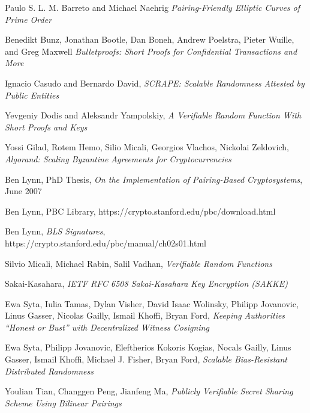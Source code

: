 \documentclass{yellowpaper}
\begin{document}
\begin{thebibliography}{99}

Paulo S. L. M. Barreto and Michael Naehrig
{\em{Pairing-Friendly Elliptic Curves of Prime Order}}

 Benedikt Bunz, Jonathan Bootle, Dan Boneh, Andrew Poelstra, Pieter Wuille, and Greg Maxwell
{\em{Bulletproofs: Short Proofs for Confidential Transactions and More}}

Ignacio Casudo and Bernardo David, 
{\em{ SCRAPE: Scalable Randomness Attested by Public Entities}} 

Yevgeniy Dodis and Aleksandr Yampolskiy, 
{\em{A Verifiable Random Function With Short Proofs and Keys}}

Yossi Gilad, Rotem Hemo, Silio Micali, Georgios Vlachos, Nickolai Zeldovich,
{\em{Algorand: Scaling Byzantine Agreements for Cryptocurrencies}}

 Ben Lynn, PhD Thesis, 
{\em{On the Implementation of Pairing-Based Cryptosystems}}, June 2007

 Ben Lynn, PBC Library, 
https://crypto.stanford.edu/pbc/download.html

 Ben Lynn, 
{\em{BLS Signatures}}, 
https://crypto.stanford.edu/pbc/manual/ch02s01.html

Silvio Micali, Michael Rabin, Salil Vadhan, 
{\em{Verifiable Random Functions}}

Sakai-Kasahara, 
{\em{IETF RFC 6508 Sakai-Kasahara Key Encryption (SAKKE)}} 

Ewa Syta, Iulia Tamas, Dylan Visher, David Isaac Wolinsky, Philipp Jovanovic, Linus Gasser, Nicolas Gailly, Ismail Khoffi, Bryan Ford, 
{\em{Keeping Authorities ``Honest or Bust'' with Decentralized Witness Cosigning}}

 Ewa Syta, Philipp Jovanovic, Eleftherios Kokoris Kogias, Nocals Gailly, Linus Gasser, Ismail Khoffi, Michael J. Fisher, Bryan Ford, 
{\em{Scalable Bias-Resistant Distributed Randomness}}

 Youlian Tian, Changgen Peng, Jianfeng Ma, 
{\em{Publicly Verifiable Secret Sharing Scheme Using Bilinear Pairings}}

\end{thebibliography} 
\end{document}
